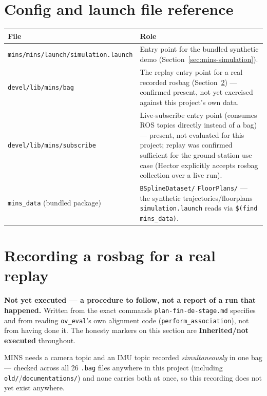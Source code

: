 \documentclass[11pt]{report}
\newenvironment{warningbox}%
  {\begin{lrbox}{\warnbox}\begin{minipage}{0.90\textwidth}}%
  {\end{minipage}\end{lrbox}%
   \begin{center}\fcolorbox{black}{codebg}{\usebox{\warnbox}}\end{center}}
\begin{document}
\section{Config and launch file reference}

\begin{center}
\begin{tabular}{p{}p{}}
\toprule
File & Role \\
\midrule
\texttt{mins/mins/launch/simulation.launch} & Entry point for the bundled
  synthetic demo (Section~\ref{sec:mins-simulation}). \\
\addlinespace
\texttt{devel/lib/mins/bag} & The replay entry point for a real recorded
  rosbag (Section~\ref{sec:mins-rosbag}) --- confirmed present, not yet
  exercised against this project's own data. \\
\addlinespace
\texttt{devel/lib/mins/subscribe} & Live-subscribe entry point (consumes
  ROS topics directly instead of a bag) --- present, not evaluated for this
  project; replay was confirmed sufficient for the ground-station use case
  (Hector explicitly accepts rosbag collection over a live run). \\
\addlinespace
\texttt{mins\_data} (bundled package) & \texttt{BSplineDataset/}\allowbreak
  \texttt{FloorPlans/} --- the synthetic trajectories/floorplans
  \texttt{simulation.launch} reads via \texttt{\$(find mins\_data)}. \\
\bottomrule
\end{tabular}
\end{center}

\section{Recording a rosbag for a real replay}
\label{sec:mins-rosbag}

\begin{warningbox}
\textbf{Not yet executed --- a procedure to follow, not a report of a run
that happened.} Written from the exact commands \texttt{plan-fin-de-stage.md}
specifies and from reading \texttt{ov\_eval}'s own alignment code
(\texttt{perform\_association}), not from having done it. The honesty
markers on this section are \textbf{Inherited/not executed} throughout.
\end{warningbox}

MINS needs a camera topic and an IMU topic recorded \emph{simultaneously} in
one bag --- checked across all 26 \texttt{.bag} files anywhere in this
project (including \texttt{old/}/\texttt{documentations/}) and none carries
both at once, so this recording does not yet exist anywhere.
\end{document}
